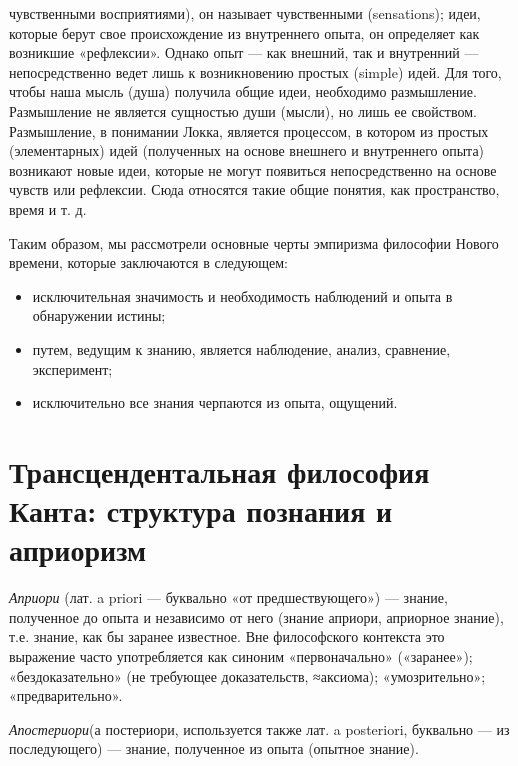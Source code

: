 \documentclass[12pt]{article}
\begin{document}
чувственными восприятиями), он называет чувственными (sensations); идеи, которые берут свое происхождение
из внутреннего опыта, он определяет как возникшие «рефлексии». Однако опыт — как внешний, так и
внутренний — непосредственно ведет лишь к возникновению простых (simple) идей. Для того, чтобы наша
мысль (душа) получила общие идеи, необходимо размышление. Размышление не является сущностью души
(мысли), но лишь ее свойством.
Размышление, в понимании Локка, является процессом, в котором из простых (элементарных) идей
(полученных на основе внешнего и внутреннего опыта) возникают новые идеи, которые не могут появиться
непосредственно на основе чувств или рефлексии. Сюда относятся такие общие понятия, как пространство,
время и т. д.

Таким образом, мы рассмотрели основные черты эмпиризма философии Нового времени, которые заключаются
в следующем:
\begin{itemize}
\item исключительная значимость и необходимость наблюдений и опыта в обнаружении истины;
\item путем, ведущим к знанию, является наблюдение, анализ, сравнение, эксперимент;
\item исключительно все знания черпаются из опыта, ощущений.
\end{itemize}


\newpage
\section{Трансцендентальная философия Канта: структура познания и априоризм}
\textit{Априори} (лат. a priori — буквально «от предшествующего»)
--- знание, полученное до опыта и независимо от него (знание априори, априорное знание),
т.е. знание, как бы заранее известное.
Вне философского контекста это выражение часто употребляется как синоним «первоначально» («заранее»);
«бездоказательно» (не требующее доказательств, ≈аксиома); «умозрительно»; «предварительно».

\textit{Апостериори}(а постериори, используется также лат. a posteriori, буквально — из последующего)
--- знание, полученное из опыта (опытное знание).
\end{document}
